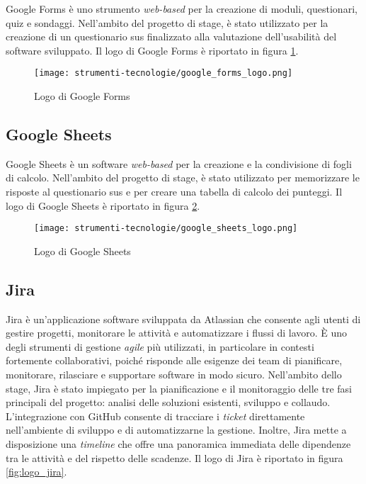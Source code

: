 Google Forms è uno strumento \textit{web-based} per la creazione di moduli, questionari, quiz e sondaggi. Nell’ambito del progetto di stage, è stato utilizzato per la creazione di un questionario \gls{sus} finalizzato alla valutazione dell’usabilità del software sviluppato. Il logo di Google Forms è riportato in figura \ref{fig:logo_google_forms}.

\begin{figure}[H]
  \centering 
  \texttt{[image: strumenti-tecnologie/google\_forms\_logo.png]} 
  \caption{Logo di Google Forms}
  \label{fig:logo_google_forms}
\end{figure}

\subsection*{Google Sheets}

Google Sheets è un software \textit{web-based} per la creazione e la condivisione di fogli di calcolo. Nell’ambito del progetto di stage, è stato utilizzato per memorizzare le risposte al questionario \gls{sus} e per creare una tabella di calcolo dei punteggi. Il logo di Google Sheets è riportato in figura \ref{fig:logo_google_sheets}.

\begin{figure}[H]
  \centering 
  \texttt{[image: strumenti-tecnologie/google\_sheets\_logo.png]} 
  \caption{Logo di Google Sheets}
  \label{fig:logo_google_sheets}
\end{figure}

\subsection*{Jira}

Jira è un'applicazione software sviluppata da Atlassian che consente agli utenti di gestire progetti, monitorare le attività e automatizzare i flussi di lavoro. È uno degli strumenti di gestione \textit{agile} più utilizzati, in particolare in contesti fortemente collaborativi, poiché risponde alle esigenze dei team di pianificare, monitorare, rilasciare e supportare software in modo sicuro. Nell’ambito dello stage, Jira è stato impiegato per la pianificazione e il monitoraggio delle tre fasi principali del progetto: analisi delle soluzioni esistenti, sviluppo e collaudo. L’integrazione con GitHub consente di tracciare i \textit{ticket} direttamente nell’ambiente di sviluppo e di automatizzarne la gestione. Inoltre, Jira mette a disposizione una \textit{timeline} che offre una panoramica immediata delle dipendenze tra le attività e del rispetto delle scadenze. Il logo di Jira è riportato in figura \ref{fig:logo_jira}.

